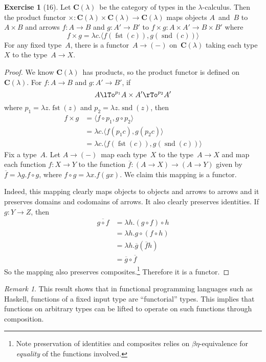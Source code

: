 \documentclass[letterpaper,12pt]{article}
\newcommand{\after}{\circ}
\DeclareMathOperator{\fst}{fst}
\DeclareMathOperator{\snd}{snd}
\newcommand{\pair}[2]{\langle{#1},{#2}\rangle}
\newcommand{\cat}[1]{\mathbf{#1}}
\newcommand{\2}{\cat{2}}
\newcommand{\C}{\cat{C}}
\newcommand{\Types}{\C(\lambda)}
\theoremstyle{definition}
\newtheorem*{exer}{Exercise}
\theoremstyle{remark}
\newtheorem*{rmk}{Remark}
\theoremstyle{direction}
\begin{document}
\begin{exer}[16]
Let \(\Types\)~be the category of types in the \(\lambda\)-calculus. Then the product functor \(\times:\Types\times\Types\to\Types\) maps objects \(A\)~and~\(B\) to~\(A\times B\) and arrows \(f:A\to B\) and \(g:A'\to B'\) to \(f\times g:A\times A'\to B\times B'\) where
\[f\times g=\lambda c.\pair{f(\fst(c))}{g(\snd(c))}\]
For any fixed type~\(A\), there is a functor~\(A\to(-)\) on~\(\Types\) taking each type~\(X\) to the type~\(A\to X\).
\end{exer}
\begin{proof}
We know \(\Types\)~has products, so the product functor is defined on~\(\Types\). For \(f:A\to B\) and \(g:A'\to B'\), if
\[A\lTo^{p_1}A\times A'\rTo^{p_2}A'\]
where \(p_1=\lambda z.\fst(z)\) and \(p_2=\lambda z.\snd(z)\), then
\begin{align*}
f\times g&=\pair{f\after p_1}{g\after p_2}\\
	&=\lambda c.\pair{f(p_1c)}{g(p_2c)}\\
	&=\lambda c.\pair{f(\fst(c))}{g(\snd(c))}
\end{align*}
Fix a type~\(A\). Let \(A\to(-)\)~map each type~\(X\) to the type~\(A\to X\) and map each function \(f:X\to Y\) to the function \(\overline{f}:(A\to X)\to(A\to Y)\) given by \(\overline{f}=\lambda g.f\after g\), where \(f\after g=\lambda x.f(gx)\). We claim this mapping is a functor.

Indeed, this mapping clearly maps objects to objects and arrows to arrows and it preserves domains and codomains of arrows. It also clearly preserves identities. If \(g:Y\to Z\), then
\begin{align*}
\overline{g\after f}&=\lambda h.(g\after f)\after h\\
	&=\lambda h.g\after(f\after h)\\
	&=\lambda h.\overline{g}(\overline{f}h)\\
	&=\overline{g}\after\overline{f}
\end{align*}
So the mapping also preserves composites.\footnote{Note preservation of identities and composites relies on \(\beta\eta\)-equivalence for \emph{equality} of the functions involved.} Therefore it is a functor.
\end{proof}
\begin{rmk}
This result shows that in functional programming languages such as Haskell, functions of a fixed input type are ``functorial'' types. This implies that functions on arbitrary types can be lifted to operate on such functions through composition.
\end{rmk}
\end{document}
